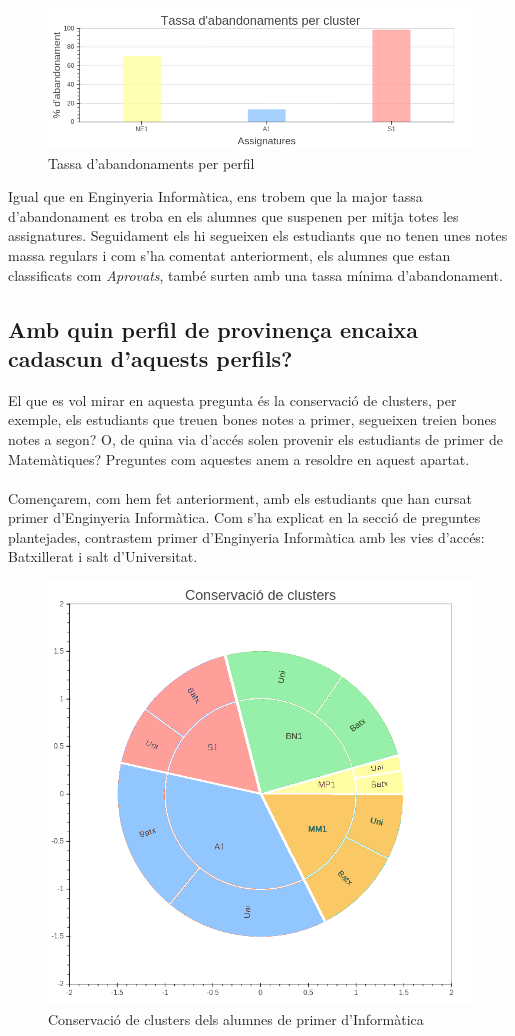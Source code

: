 \documentclass[12pt,a4paper,catalan]{article}
\begin{document}
\begin{figure}[h]
\centering
\includegraphics[width=.9\linewidth]{img/abandonaments_primer_mates.png}
\caption{Tassa d'abandonaments per perfil}
\end{figure}

Igual que en Enginyeria Informàtica, ens trobem que la major tassa d'abandonament es troba en els alumnes que suspenen per mitja totes les assignatures. Seguidament els hi segueixen els estudiants que no tenen unes notes massa regulars i com s'ha comentat anteriorment, els alumnes que estan classificats com \textit{Aprovats}, també surten amb una tassa mínima d'abandonament.

\subsection{Amb quin perfil de provinença encaixa cadascun d'aquests perfils?}
El que es vol mirar en aquesta pregunta és la conservació de clusters, per exemple, els estudiants que treuen bones notes a primer, segueixen treien bones notes a segon? O, de quina via d'accés solen provenir els estudiants de primer de Matemàtiques? Preguntes com aquestes anem a resoldre en aquest apartat. 
\\
\\
Començarem, com hem fet anteriorment, amb els estudiants que han cursat primer d'Enginyeria Informàtica. Com s'ha explicat en la secció de preguntes plantejades, contrastem primer d'Enginyeria Informàtica amb les vies d'accés: Batxillerat i salt d'Universitat.

\begin{figure}[h]
\centering
\includegraphics[width=.6\linewidth]{img/conservacio_clusters_primer_info.png}
\caption{Conservació de clusters dels alumnes de primer d'Informàtica}
\end{figure}
\end{document}
